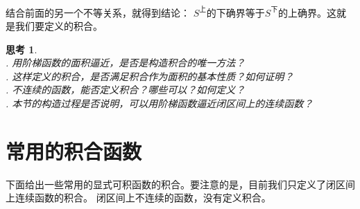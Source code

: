 \documentclass[12pt,UTF8]{ctexbook}
\newtheorem{sk}{思考}[section]
\begin{document}
\begin{appendix}
结合前面的另一个不等关系，就得到结论：
$S^{\text{上}}$的下确界等于$S^{\text{下}}$的上确界。这就是我们要定义的积合。

\begin{sk}
    \mbox{} \\
    . 用阶梯函数的面积逼近，是否是构造积合的唯一方法？ \\
    . 这样定义的积合，是否满足积合作为面积的基本性质？如何证明？\\
    . 不连续的函数，能否定义积合？哪些可以？如何定义？\\
    . 本节的构造过程是否说明，可以用阶梯函数逼近闭区间上的连续函数？
\end{sk}

\section{常用的积合函数}

下面给出一些常用的显式可积函数的积合。要注意的是，目前我们只定义了闭区间上连续函数的积合。
闭区间上不连续的函数，没有定义积合。


\end{appendix}
\end{document}
